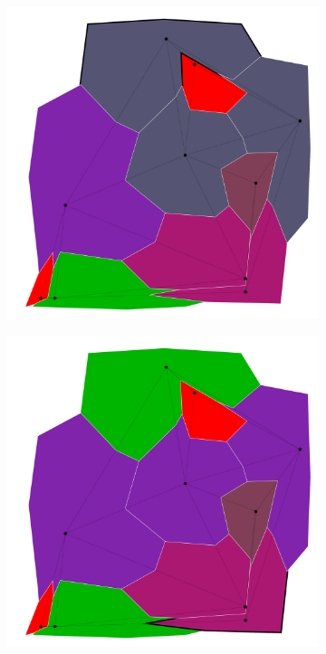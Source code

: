 \documentclass{article}
\begin{document}
\begin{figure}[h!]
\begin{subfigure}{0.18\textwidth}
				\caption{}
			\end{subfigure}
			\;
			\begin{subfigure}{0.18\textwidth}
				\centering
				\includegraphics[width=\textwidth]{images/sequences/forward_backtracking/bt_forward_I00007}
				\caption{}
			\end{subfigure}
			\;
			\begin{subfigure}{0.18\textwidth}
				\centering
				\includegraphics[width=\textwidth]{images/sequences/forward_backtracking/bt_forward_I00009}

\end{subfigure}
\end{figure}
\end{document}

